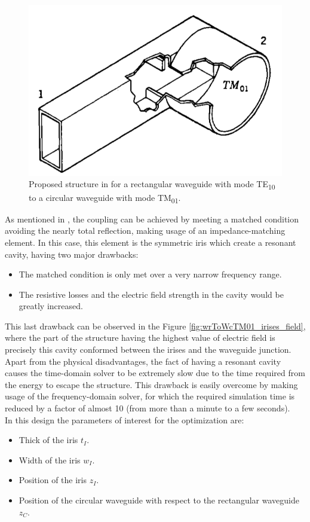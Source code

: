 \documentclass[english,twoside]{article}
\begin{document}
		\begin{figure}[H]
			\centering
			\includegraphics[width=.5\textwidth]{figures/book_wr2wctm01}
			\caption{Proposed structure in \cite{montgomery} for a rectangular waveguide with mode TE\textsubscript{10} to a circular waveguide with mode TM\textsubscript{01}.}
			\label{fig:book_wr2wctm01}
		\end{figure}
    
    As mentioned in \cite{montgomery}, the coupling can be achieved by meeting a matched condition avoiding the nearly total reflection, making usage of an impedance-matching element. In this case, this element is the symmetric iris which create a resonant cavity, having two major drawbacks:
    \begin{itemize}
        \item The matched condition is only met over a very narrow frequency range.
        \item The resistive losses and the electric field strength in the cavity would be greatly increased.
    \end{itemize}
    
    This last drawback can be observed in the Figure \ref{fig:wrToWcTM01_irises_field}, where the part of the structure having the highest value of electric field is precisely this cavity conformed between the irises and the waveguide junction. Apart from the physical disadvantages, the fact of having a resonant cavity causes the time-domain solver to be extremely slow due to the time required from the energy to escape the structure. This drawback is easily overcome by making usage of the frequency-domain solver, for which the required simulation time is reduced by a factor of almost 10 (from more than a minute to a few seconds).\\
	
		In this design the parameters of interest for the optimization are:
		\begin{itemize}
			\item Thick of the iris $t_I$.
			\item Width of the iris $w_I$.
			\item Position of the iris $z_I$.
			\item Position of the circular waveguide with respect to the rectangular waveguide $z_C$.
		\end{itemize}
		
\end{document}
